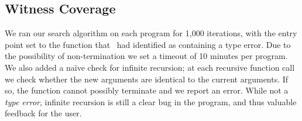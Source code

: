 \subsection{Witness Coverage}
\label{sec:eval:witness-coverage}
%
We ran our search algorithm on each program for 1,000 iterations, with
the entry point set to the function that \ocaml\ had identified as
containing a type error.
%
Due to the possibility of non-termination we set a timeout of 10 minutes
per program.
%
%
We also added a na\"ive check for infinite recursion; at each recursive
function call we check whether the new arguments are identical to the
current arguments.
%
If so, the function cannot possibly terminate and we report an error.
%
While not a \emph{type error}, infinite recursion is still a clear bug
in the program, and thus valuable feedback for the user.

